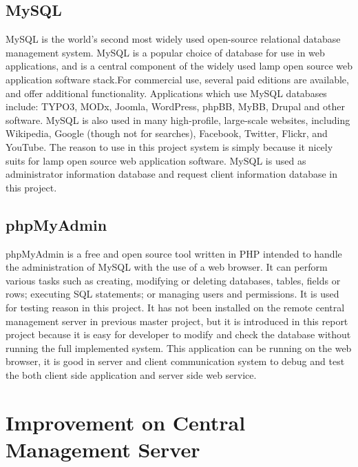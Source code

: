 \subsection{MySQL}
\par MySQL is the world's second most widely used open-source relational database management system. MySQL is a popular choice of database for use in web applications, and is a central component of the widely used \gls{lamp} open source web application software stack.For commercial use, several paid editions are available, and offer additional functionality. Applications which use MySQL databases include: TYPO3, MODx, Joomla, WordPress, phpBB, MyBB, Drupal and other software. MySQL is also used in many high-profile, large-scale websites, including Wikipedia, Google (though not for searches), Facebook, Twitter, Flickr, and YouTube. The reason to use in this project system is simply because it nicely suits for \gls{lamp} open source web application software. MySQL is used as administrator information database and request client information database in this project.

\subsection{phpMyAdmin}
\par phpMyAdmin is a free and open source tool written in PHP intended to handle the administration of MySQL with the use of a web browser. It can perform various tasks such as creating, modifying or deleting databases, tables, fields or rows; executing SQL statements; or managing users and permissions. It is used for testing reason in this project. It has not been installed on the remote central management server in previous master project, but it is introduced in this report project because it is easy for developer to modify and check the database without running the full implemented system. This application can be running on the web browser, it is good in server and client communication system to debug and test the both client side application and server side web service.

\section{Improvement on Central Management Server}

